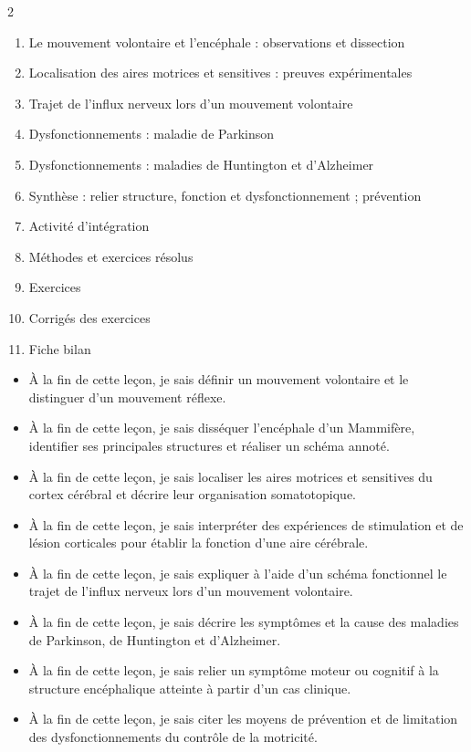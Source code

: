 \documentclass[11pt]{article}
\begin{document}
\begin{sommaire}
\begin{multicols}{2}
\begin{enumerate}
\item Le mouvement volontaire et l'encéphale : observations et dissection
\item Localisation des aires motrices et sensitives : preuves expérimentales
\item Trajet de l'influx nerveux lors d'un mouvement volontaire
\item Dysfonctionnements : maladie de Parkinson
\item Dysfonctionnements : maladies de Huntington et d'Alzheimer
\item Synthèse : relier structure, fonction et dysfonctionnement ; prévention
\item Activité d'intégration
\item Méthodes et exercices résolus
\item Exercices
\item Corrigés des exercices
\item Fiche bilan
\end{enumerate}
\end{multicols}
\end{sommaire}

\begin{objectifs}
\begin{itemize}
\item À la fin de cette leçon, je sais définir un mouvement volontaire et le distinguer d'un mouvement réflexe.
\item À la fin de cette leçon, je sais disséquer l'encéphale d'un Mammifère, identifier ses principales structures et réaliser un schéma annoté.
\item À la fin de cette leçon, je sais localiser les aires motrices et sensitives du cortex cérébral et décrire leur organisation somatotopique.
\item À la fin de cette leçon, je sais interpréter des expériences de stimulation et de lésion corticales pour établir la fonction d'une aire cérébrale.
\item À la fin de cette leçon, je sais expliquer à l'aide d'un schéma fonctionnel le trajet de l'influx nerveux lors d'un mouvement volontaire.
\item À la fin de cette leçon, je sais décrire les symptômes et la cause des maladies de Parkinson, de Huntington et d'Alzheimer.
\item À la fin de cette leçon, je sais relier un symptôme moteur ou cognitif à la structure encéphalique atteinte à partir d'un cas clinique.
\item À la fin de cette leçon, je sais citer les moyens de prévention et de limitation des dysfonctionnements du contrôle de la motricité.
\end{itemize}
\end{objectifs}
\end{document}

